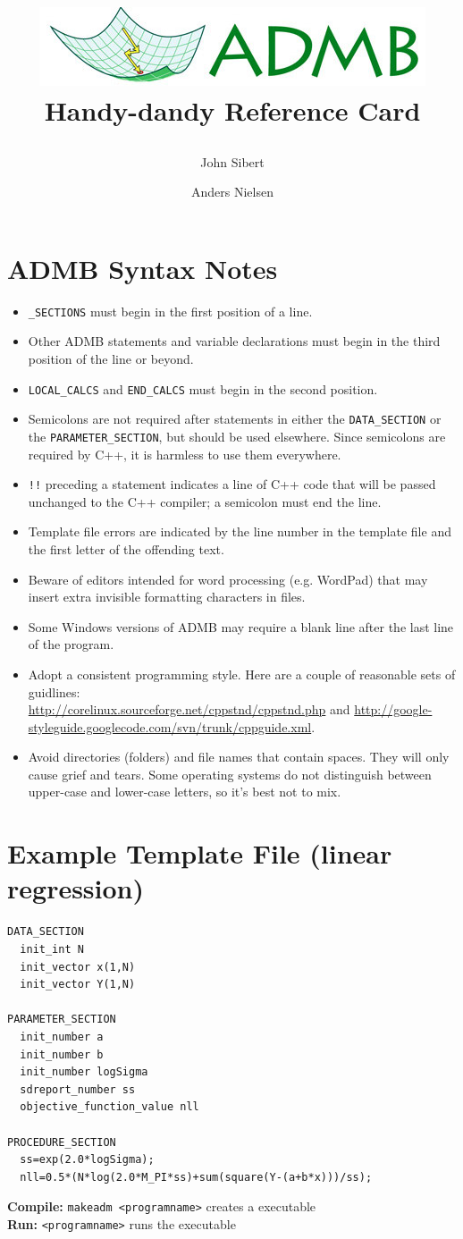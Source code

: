 \documentclass[a4paper,10pt,notumble]{leaflet}
\title{\begin{minipage}[t]{0.98\textwidth}\begin{center}
\includegraphics[width=\textwidth]{./cropped-logo-20080527.jpeg}
{\color{admbgreen}Handy-dandy Reference Card}\\
    \end{center}\end{minipage}}
\author{John Sibert \and Anders Nielsen}
\begin{document}
\maketitle
\thispagestyle{empty}
\scriptsize
\small
\parindent=0pt

\section{ADMB Syntax Notes}
\begin{itemize}
\item \verb+_SECTIONS+ must begin in the first position of a line.
\item Other ADMB statements and variable declarations
 must begin in the third position  of the line or beyond.
\item \verb+LOCAL_CALCS+ and \verb+END_CALCS+ 
must begin in the second position.
\item Semicolons are not
required after statements in either the \verb+DATA_SECTION+ or the
\verb+PARAMETER_SECTION+, but should be used elsewhere. Since
semicolons are required by C++, it is harmless to use them
everywhere.
\item \verb+!!+ preceding a statement indicates a line of C++ code
that will be passed unchanged to the C++ compiler; a semicolon must
end the line.
\item Template file errors are indicated by the line number in the template
file and the first letter of the offending text.
\item Beware of editors intended for word processing (e.g. WordPad)
that may insert extra invisible formatting characters in files.
\item Some Windows versions of ADMB may require a
blank line after the last line of the program. 
\item Adopt a consistent programming style. Here are a couple of
reasonable sets of guidlines:\\
\url{http://corelinux.sourceforge.net/cppstnd/cppstnd.php}
and
\url{http://google-styleguide.googlecode.com/svn/trunk/cppguide.xml}.
\item Avoid directories (folders) and file names that contain
spaces. They will only cause grief and tears. Some operating systems do
not distinguish between upper-case and lower-case letters, so it's
best not to mix.
\end{itemize}

\section{Example Template File (linear regression)}
\begin{verbatim}
DATA_SECTION
  init_int N
  init_vector x(1,N)
  init_vector Y(1,N)

PARAMETER_SECTION
  init_number a
  init_number b
  init_number logSigma
  sdreport_number ss
  objective_function_value nll

PROCEDURE_SECTION
  ss=exp(2.0*logSigma);
  nll=0.5*(N*log(2.0*M_PI*ss)+sum(square(Y-(a+b*x)))/ss);
\end{verbatim}
{\bf Compile:} \verb|makeadm <programname>| creates a executable \\
{\bf Run:} \verb|<programname>| runs the executable
\end{document}
